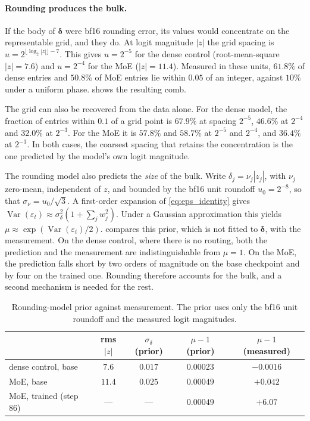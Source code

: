 \paragraph{Rounding produces the bulk.}
If the body of $\boldsymbol\delta$ were bf16 rounding error, its values would
concentrate on the representable grid, and they do. At logit magnitude $|z|$
the grid spacing is $u=2^{\lfloor\log_2|z|\rfloor-7}$. This gives $u=2^{-5}$
for the dense control (root-mean-square $|z|=7.6$) and $u=2^{-4}$ for the MoE
($|z|=11.4$). Measured in these units, $61.8\%$ of dense entries and $50.8\%$ of
MoE entries lie within $0.05$ of an integer, against $10\%$ under a uniform
phase.  shows the resulting comb.

The grid can also be recovered from the data alone. For the dense model, the
fraction of entries within $0.1$ of a grid point is $67.9\%$ at spacing
$2^{-5}$, $46.6\%$ at $2^{-4}$ and $32.0\%$ at $2^{-3}$. For the MoE it is
$57.8\%$ and $58.7\%$ at $2^{-5}$ and $2^{-4}$, and $36.4\%$ at $2^{-3}$. In both
cases, the coarsest spacing that retains the concentration is the one
predicted by the model's own logit magnitude.

The rounding model also predicts the \emph{size} of the bulk. Write
$\delta_j=\nu_j|z_j|$, with $\nu_j$ zero-mean, independent of $z$, and bounded
by the bf16 unit roundoff $u_0=2^{-8}$, so that $\sigma_\nu=u_0/\sqrt3$. A
first-order expansion of \eqref{eq:eps_identity} gives
$\operatorname{Var}(\varepsilon_t)\approx\sigma_\delta^2(1+\sum_jw_j^2)$.
Under a Gaussian approximation this yields
$\mu\approx\exp(\operatorname{Var}(\varepsilon_t)/2)$. 
compares this prior, which is not fitted to $\boldsymbol\delta$, with the
measurement. On the dense control, where there is no routing, both the
prediction and the measurement are indistinguishable from $\mu=1$. On the MoE,
the prediction falls short by two orders of magnitude on the base checkpoint
and by four on the trained one. Rounding therefore accounts for the bulk, and
a second mechanism is needed for the rest.

\begin{table}[t]
\centering
\caption{Rounding-model prior against measurement. The prior uses only the bf16
unit roundoff and the measured logit magnitudes.}
\label{tab:rounding}
\begin{tabular}{lcccc}
\toprule
 & rms $|z|$ & $\sigma_\delta$ (prior) & $\mu-1$ (prior) & $\mu-1$ (measured) \\
\midrule
dense control, base    & $7.6$  & $0.017$ & $0.00023$ & $-0.0016$ \\
MoE, base              & $11.4$ & $0.025$ & $0.00049$ & $+0.042$ \\
MoE, trained (step 86) & ---    & ---     & $0.00049$ & $+6.07$ \\
\bottomrule
\end{tabular}
\end{table}


